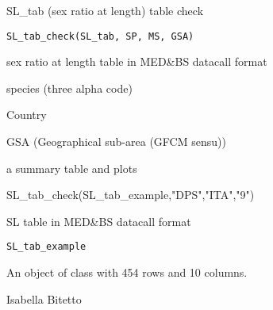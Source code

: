 \documentclass[a4paper]{book}
\begin{document}
%
\begin{Description}\relax
SL\_tab (sex ratio at length) table check
\end{Description}
%
\begin{Usage}
\begin{verbatim}
SL_tab_check(SL_tab, SP, MS, GSA)
\end{verbatim}
\end{Usage}
%
\begin{Arguments}
\begin{ldescription}
\item[\code{SL\_tab}] sex ratio at length table in MED\&BS datacall format

\item[\code{SP}] species (three alpha code)

\item[\code{MS}] Country

\item[\code{GSA}] GSA (Geographical sub-area (GFCM sensu))
\end{ldescription}
\end{Arguments}
%
\begin{Value}
a summary table and plots
\end{Value}
%
\begin{Examples}
\begin{ExampleCode}
SL_tab_check(SL_tab_example,"DPS","ITA","9")
\end{ExampleCode}
\end{Examples}
%
\begin{Description}\relax
SL table in MED\&BS datacall format
\end{Description}
%
\begin{Usage}
\begin{verbatim}
SL_tab_example
\end{verbatim}
\end{Usage}
%
\begin{Format}
An object of class  with 454 rows and 10 columns.
\end{Format}
%
\begin{Author}\relax
Isabella Bitetto 
\end{Author}
\end{document}
